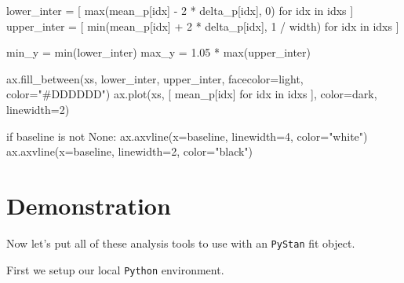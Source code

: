 \documentclass[
  letterpaper,
  DIV=11,
  numbers=noendperiod]{scrartcl}
\newenvironment{Shaded}{\begin{snugshade}}{\end{snugshade}}
\newcommand{\BuiltInTok}[1]{\textcolor[rgb]{0.00,0.23,0.31}{#1}}
\newcommand{\ControlFlowTok}[1]{\textcolor[rgb]{0.00,0.23,0.31}{#1}}
\newcommand{\DecValTok}[1]{\textcolor[rgb]{0.68,0.00,0.00}{#1}}
\newcommand{\FloatTok}[1]{\textcolor[rgb]{0.68,0.00,0.00}{#1}}
\newcommand{\KeywordTok}[1]{\textcolor[rgb]{0.00,0.23,0.31}{#1}}
\newcommand{\NormalTok}[1]{\textcolor[rgb]{0.00,0.23,0.31}{#1}}
\newcommand{\OperatorTok}[1]{\textcolor[rgb]{0.37,0.37,0.37}{#1}}
\newcommand{\StringTok}[1]{\textcolor[rgb]{0.13,0.47,0.30}{#1}}
\newcommand{\VariableTok}[1]{\textcolor[rgb]{0.07,0.07,0.07}{#1}}
\begin{document}
\begin{Shaded}
\begin{Highlighting}[]
\NormalTok{  lower\_inter }\OperatorTok{=}\NormalTok{ [ }\BuiltInTok{max}\NormalTok{(mean\_p[idx] }\OperatorTok{{-}} \DecValTok{2} \OperatorTok{*}\NormalTok{ delta\_p[idx], }\DecValTok{0}\NormalTok{)}
                  \ControlFlowTok{for}\NormalTok{ idx }\KeywordTok{in}\NormalTok{ idxs ]}
\NormalTok{  upper\_inter }\OperatorTok{=}\NormalTok{ [ }\BuiltInTok{min}\NormalTok{(mean\_p[idx] }\OperatorTok{+} \DecValTok{2} \OperatorTok{*}\NormalTok{ delta\_p[idx], }\DecValTok{1} \OperatorTok{/}\NormalTok{ width) }
                  \ControlFlowTok{for}\NormalTok{ idx }\KeywordTok{in}\NormalTok{ idxs ]}
  
\NormalTok{  min\_y }\OperatorTok{=}        \BuiltInTok{min}\NormalTok{(lower\_inter)}
\NormalTok{  max\_y }\OperatorTok{=} \FloatTok{1.05} \OperatorTok{*} \BuiltInTok{max}\NormalTok{(upper\_inter)}
  
\NormalTok{  ax.fill\_between(xs, lower\_inter, upper\_inter,}
\NormalTok{                  facecolor}\OperatorTok{=}\NormalTok{light, color}\OperatorTok{=}\StringTok{"\#DDDDDD"}\NormalTok{)}
\NormalTok{  ax.plot(xs, [ mean\_p[idx] }\ControlFlowTok{for}\NormalTok{ idx }\KeywordTok{in}\NormalTok{ idxs ], color}\OperatorTok{=}\NormalTok{dark, linewidth}\OperatorTok{=}\DecValTok{2}\NormalTok{)}
  
  \ControlFlowTok{if}\NormalTok{ baseline }\KeywordTok{is} \KeywordTok{not} \VariableTok{None}\NormalTok{:}
\NormalTok{    ax.axvline(x}\OperatorTok{=}\NormalTok{baseline, linewidth}\OperatorTok{=}\DecValTok{4}\NormalTok{, color}\OperatorTok{=}\StringTok{"white"}\NormalTok{)}
\NormalTok{    ax.axvline(x}\OperatorTok{=}\NormalTok{baseline, linewidth}\OperatorTok{=}\DecValTok{2}\NormalTok{, color}\OperatorTok{=}\StringTok{"black"}\NormalTok{)}
\end{Highlighting}
\end{Shaded}

\hypertarget{demonstration}{%
\section{Demonstration}\label{demonstration}}

Now let's put all of these analysis tools to use with an \texttt{PyStan}
fit object.

First we setup our local \texttt{Python} environment.
\end{document}
